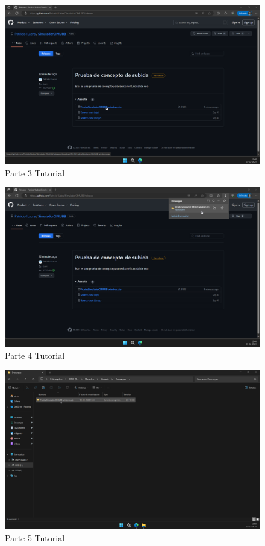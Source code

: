 \begin{enumerate}[label=\arabic*.-]
\begin{figure}[ht]
    \centering
    \includegraphics[width=13cm]{figures/TutorialWindows/tutorial (3).png}
    \caption{Parte 3 Tutorial}
    \label{fig:tutowin3}
\end{figure}

\begin{figure}[ht]
    \centering
    \includegraphics[width=13cm]{figures/TutorialWindows/tutorial (4).png}
    \caption{Parte 4 Tutorial}
    \label{fig:tutowin4}
\end{figure}

\begin{figure}[ht]
    \centering
    \includegraphics[width=13cm]{figures/TutorialWindows/tutorial (5).png}
    \caption{Parte 5 Tutorial}
    \label{fig:tutowin5}
\end{figure}
\end{enumerate}
\clearpage

